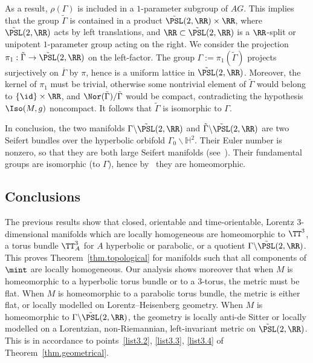 As a result, $\rho(\Gamma)$ is included in a $1$-parameter subgroup of $AG$. This implies that the group $\tilde{\Gamma}$ is contained in a product $\tilde{\PSL}(2,\RR) \times \RR$, where $\tilde{\PSL}(2,\RR)$ acts by left translations, and $\RR \subset \tilde{\PSL}(2,\RR)$ is a $\RR$-split or unipotent $1$-parameter group acting on the right. We consider the projection $\pi_1: \tilde{\Gamma} \to \tilde{\PSL}(2,\RR)$ on the left-factor. The group $\Gamma:=\pi_1(\tilde{\Gamma})$ projects surjectively on $\overline{\Gamma}$ by $\pi$, hence is a uniform lattice in $\tilde{\PSL}(2,\RR)$. Moreover, the kernel of $\pi_1$ must be trivial, otherwise some nontrivial element of $\tilde{\Gamma}$ would belong to $\{\id \} \times \RR$, and $\Nor(\tilde{\Gamma})/\tilde{\Gamma}$ would be compact, contradicting the hypothesis $\Iso(M,g)$ noncompact. It follows that $\tilde{\Gamma}$ is isomorphic to $\Gamma$.

In conclusion, the two manifolds $\Gamma \backslash \tilde{\PSL}(2,\RR)$ and $\tilde{\Gamma} \backslash \tilde{\PSL}(2,\RR)$ are two Seifert bundles over the hyperbolic orbifold $\Gamma_0 \backslash {\mathbb H}^2$. Their Euler number is nonzero, so that they are both large Seifert manifolds (see~\cite[p.~92]{orlik}). Their fundamental groups are isomorphic (to $\Gamma$), hence by~\cite[Theorem~6, p.~97]{orlik} they are homeomorphic.



\subsection{Conclusions}
The previous results show that closed, orientable and time-orientable, Lorentz $3$-dimensional manifolds which are locally homogeneous are homeomorphic to $\TT^3$, a torus bundle $\TT_A^3$ for $A$ hyperbolic or parabolic, or a quotient $\Gamma \backslash \tilde{\PSL}(2,\RR)$. This proves Theorem~\ref{thm.topological} for manifolds such that all components of $\mint$ are locally homogeneous. Our analysis shows moreover that when $M$ is homeomorphic to a hyperbolic torus bundle or to a $3$-torus, the metric must be flat. When $M$ is homeomorphic to a parabolic torus bundle, the metric is either flat, or locally modelled on Lorentz--Heisenberg geometry. When $M$ is homeomorphic to $\Gamma \backslash \tilde{\PSL}(2,\RR)$, the geometry is locally anti-de Sitter or locally modelled on a Lorentzian, non-Riemannian, left-invariant metric on $\tilde{\PSL}(2,\RR)$. This is in accordance to points~\eqref{list3.2}, \eqref{list3.3}, \eqref{list3.4} of Theorem~\ref{thm.geometrical}.



